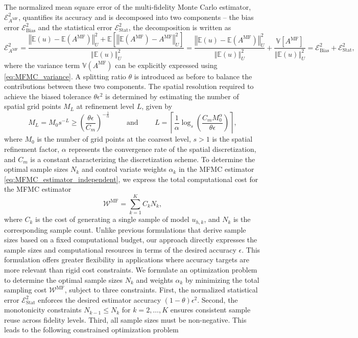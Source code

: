 %
The normalized mean square error of the multi-fidelity Monte Carlo estimator, $\mathcal{E}_{A^{\text{MF}}}^2$, quantifies its accuracy and is decomposed into two components -- the bias error $\mathcal{E}_{\text{Bias}}^2$ and the statistical error $\mathcal{E}_{\text{Stat}}^2$, the decomposition is written as 
%
\[
\mathcal{E}_{A^{\text{MF}}}^2= \frac{\left\Vert\mathbb{E}(u)-\mathbb{E}(A^{\text{MF}}) \right\Vert_{U}^2+\mathbb E\left[\left\Vert\mathbb{E}(A^{\text{MF}})-A^{\text{MF}} \right\Vert_{U}^2\right]}{\left\Vert\mathbb{E}(u) \right\Vert_{U}^2} =\frac{\left\Vert\mathbb{E}(u)-\mathbb{E}(A^{\text{MF}}) \right\Vert_{U}^2}{\left\Vert\mathbb{E}(u) \right\Vert_{U}^2}+ \frac{\mathbb{V}\left[A^{\text{MF}}\right]}{\left\Vert\mathbb{E}(u) \right\Vert_{U}^2}=\mathcal{E}_{\text{Bias}}^2 + \mathcal{E}_{\text{Stat}}^2,
\]
%
where the variance term $\mathbb{V}\left(A^{\text{MF}}\right)$  can be explicitly expressed using \eqref{eq:MFMC_variance}. A splitting ratio $\theta$ is introduced as before to balance the contributions between these two components. The spatial resolution required to achieve the biased tolerance $\theta \epsilon^2$ is determined by estimating the number of spatial grid points $M_L$ at refinement level $L$, given by
%
\begin{equation}
    \label{eq:SLSGC_MLS_SpatialGridsNo}
    M_L = M_0s^{-L} \ge \left(\frac{\theta\epsilon}{C_m}\right)^{-\frac 1 {\alpha}} \qquad \text{ and } \qquad     L = \left\lceil \frac{1}{\alpha}\log_s \left(\frac{C_m M_0^\alpha}{\theta\epsilon}\right) \right\rceil,
\end{equation}
%
where $M_0$ is the number of grid points at the coarsest level, $s>1$ is the spatial refinement factor, $\alpha$ represents the convergence rate of the spatial discretization, and $C_m$ is a constant characterizing the discretization scheme. To determine the optimal sample sizes $N_k$ and control variate weights $\alpha_k$ in the MFMC estimator \eqref{eq:MFMC_estimator_independent}, we express the total computational cost for the MFMC estimator
%
\[
\mathcal{W}^{\text{MF}} = \sum_{k=1}^K C_kN_k,
\]
%
where $C_k$ is the cost of generating a single sample of model $u_{h,k}$, and $N_k$ is the corresponding sample count. Unlike previous formulations \cite{PeWiGu:2016} that derive sample sizes based on a fixed computational budget, our approach directly expresses the sample sizes and computational resources in terms of the desired accuracy $\epsilon$. This formulation offers greater flexibility in applications where accuracy targets are more relevant than rigid cost constraints. We formulate an optimization problem to determine the optimal sample sizes $N_k$ and weights $\alpha_k$ by minimizing the total sampling cost $\mathcal{W}^{\text{MF}}$, subject to three constraints. First, the normalized statistical error $\mathcal{E}_{\text{Stat}}^2$ enforces the desired estimator accuracy $(1-\theta)\epsilon^2$. Second,  the monotonicity constraints $N_{k-1}\le N_k$ for $k=2,\ldots, K$ ensures consistent sample reuse across fidelity levels. Third, all sample sizes must be non-negative. This leads to the following constrained optimization problem
